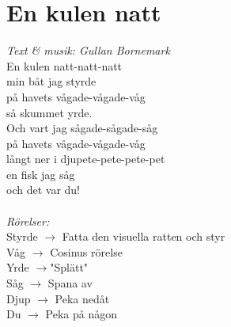 \section{En kulen natt}
\textit{Text \& musik: Gullan Bornemark}
\vspace{2mm}\\
En kulen natt-natt-natt\\
min båt jag styrde\\
på havets vågade-vågade-våg\\
så skummet yrde.\\
Och vart jag sågade-sågade-såg\\
på havets vågade-vågade-våg\\
långt ner i djupete-pete-pete-pet\\
en fisk jag såg\\
och det var du!\\
\\
\textit{Rörelser:}\\
Styrde $\rightarrow$ Fatta den visuella ratten och styr\\
Våg $\rightarrow$ Cosinus rörelse\\
Yrde $\rightarrow$"Splätt"\\
Såg $\rightarrow$ Spana av\\
Djup $\rightarrow$ Peka nedåt\\
Du $\rightarrow$ Peka på någon

